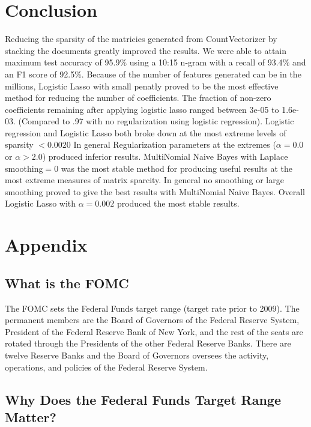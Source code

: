 \documentclass[11pt]{article}
\begin{document}
{\section{Conclusion}
Reducing the sparsity of the matricies generated from CountVectorizer by stacking the documents greatly improved the results.
We were able to attain maximum test accuracy of 95.9$\%$ using a 10:15 n-gram with a recall of 93.4$\%$ and an F1 score of 92.5$\%$.
Because of the number of features generated can be in the millions, Logistic Lasso with small penatly proved to be the most effective 
method for reducing the number of coefficients.
The fraction of non-zero coefficients remaining after applying logistic lasso
ranged between 3e-05 to 1.6e-03.  (Compared to .97 with no regularization using logistic regression).
Logistic regression  and Logistic Lasso both broke down at the most extreme levels of sparsity $<0.0020$ 
In general Regularization parameters at the extremes ($\alpha=0.0$ or $\alpha > 2.0$) produced inferior results.
MultiNomial Naive Bayes with Laplace smoothing$=0$ was the most stable method for producing useful results at the
most extreme measures of matrix sparcity.  In general no smoothing or large smoothing proved to give the best results with
MultiNomial Naive Bayes. Overall Logistic Lasso with $\alpha = 0.002$ produced the most stable results.

\appendix
\section{Appendix}

\subsection{What is the FOMC}

The FOMC sets the Federal Funds target range (target rate prior to 2009).  The permanent members are the Board of Governors of the Federal Reserve System, President of the Federal Reserve Bank of New York, and the rest of the seats are rotated through the Presidents of the other Federal Reserve Banks.  There are twelve Reserve Banks and the Board of Governors oversees the activity, operations, and policies of the Federal Reserve System.   

\subsection{Why Does the Federal Funds Target Range Matter?}

}
\end{document}
